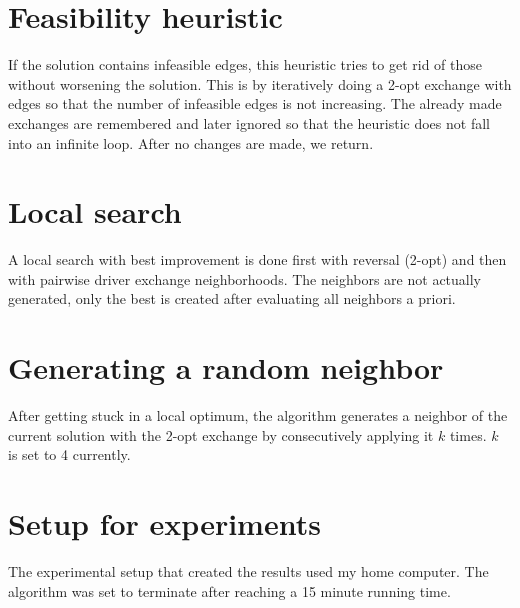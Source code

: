 \documentclass{article}
\begin{document}
\section*{Feasibility heuristic}
If the solution contains infeasible edges, this heuristic tries to get rid of those without worsening the solution. This is by iteratively doing a 2-opt exchange with edges so that the number of infeasible edges is not increasing. The already made exchanges are remembered and later ignored so that the heuristic does not fall into an infinite loop. After no changes are made, we return.
\section*{Local search}
A local search with best improvement is done first with reversal (2-opt) and then with pairwise driver exchange neighborhoods. The neighbors are not actually generated, only the best is created after evaluating all neighbors a priori.
\section*{Generating a random neighbor}
After getting stuck in a local optimum, the algorithm generates a neighbor of the current solution with the 2-opt exchange by consecutively applying it $k$ times. $k$ is set to 4 currently.
\section*{Setup for experiments}
The experimental setup that created the results used my home computer. The algorithm was set to terminate after reaching a 15 minute running time.
\end{document}
